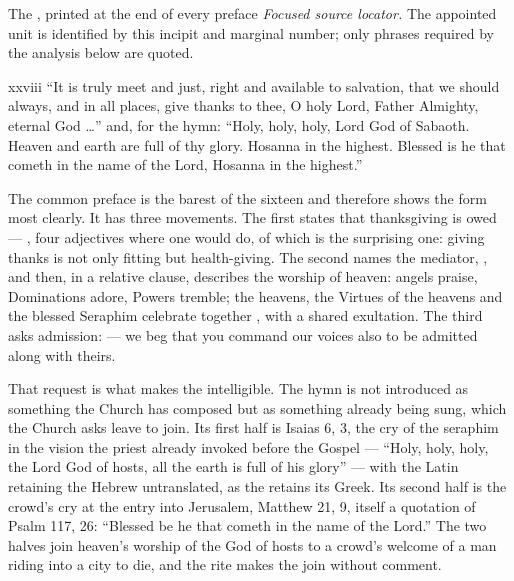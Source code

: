 \begin{appointed}{The , printed at the end of every preface}
\textit{Focused source locator.} The appointed unit is identified by this incipit and marginal number; only phrases required by the analysis below are quoted.
\end{appointed}

\begin{englishwitness}{xxviii}
``It is truly meet and just, right and available to salvation, that we should
always, and in all places, give thanks to thee, O holy Lord, Father Almighty,
eternal God \dots'' and, for the hymn: ``Holy, holy, holy, Lord God of Sabaoth.
Heaven and earth are full of thy glory. Hosanna in the highest. Blessed is he
that cometh in the name of the Lord, Hosanna in the highest.''
\end{englishwitness}

The common preface is the barest of the sixteen and therefore shows the form
most clearly. It has three movements. The first states that thanksgiving is
owed --- , four
adjectives where one would do, of which  is the surprising
one: giving thanks is not only fitting but health-giving. The second names the
mediator, , and then, in a relative
clause, describes the worship of heaven: angels praise, Dominations adore,
Powers tremble; the heavens, the Virtues of the heavens and the blessed Seraphim
celebrate together , with a shared exultation. The
third asks admission:  --- we beg that you command our voices also to be admitted along
with theirs.

That request is what makes the  intelligible. The hymn is not
introduced as something the Church has composed but as something already being
sung, which the Church asks leave to join. Its first half is Isaias 6, 3, the
cry of the seraphim in the vision the priest already invoked before the Gospel
--- ``Holy, holy, holy, the Lord God of hosts, all the earth is full of his
glory'' --- with the Latin retaining the Hebrew  untranslated,
as the  retains its Greek. Its second half is the crowd's cry at
the entry into Jerusalem, Matthew 21, 9, itself a quotation of Psalm 117, 26:
``Blessed be he that cometh in the name of the Lord.'' The two halves join
heaven's worship of the God of hosts to a crowd's welcome of a man riding into
a city to die, and the rite makes the join without comment.


